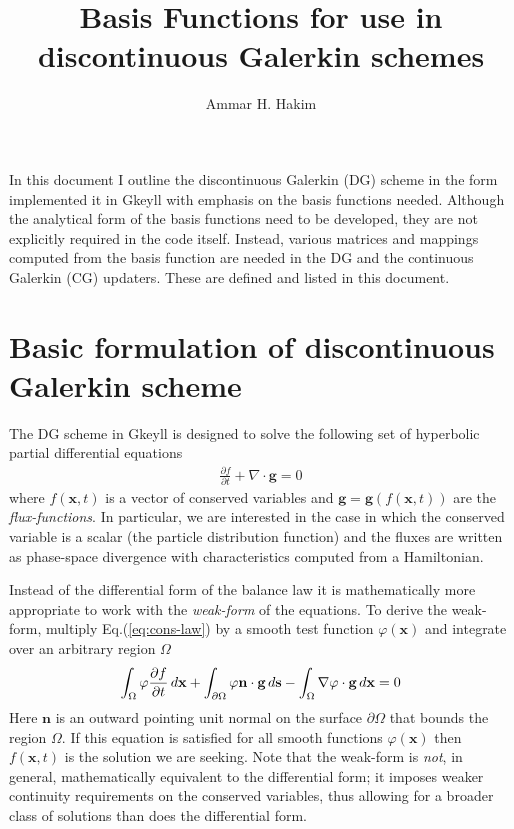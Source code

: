 \documentclass[11pt, reqno]{amsart}
\title[Basis Functions]{Basis Functions for use in discontinuous Galerkin schemes}
\author{Ammar H. Hakim}%
\date{}%
\newcommand{\eqr}[1]{Eq.\thinspace(#1)}
\newcommand{\pfrac}[2]{\frac{\partial #1}{\partial #2}}
\newcommand{\mvec}[1]{\mathbf{#1}}
\theoremstyle{definition}
\begin{document}
%
\maketitle

In this document I outline the discontinuous Galerkin (DG) scheme in
the form implemented it in Gkeyll with emphasis on the basis functions
needed. Although the analytical form of the basis functions need to be
developed, they are not explicitly required in the code
itself. Instead, various matrices and mappings computed from the basis
function are needed in the DG and the continuous Galerkin (CG)
updaters. These are defined and listed in this document.

\section{Basic formulation of discontinuous Galerkin scheme}

The DG scheme in Gkeyll is designed to solve the following set of
hyperbolic partial differential equations
\begin{align}
  \pfrac{f}{t} + \nabla\cdot\mvec{g} = 0 \label{eq:cons-law}
\end{align}
where $f(\mvec{x},t)$ is a vector of conserved variables and $\mvec{g}
= \mvec{g}(f(\mvec{x},t))$ are the \emph{flux-functions}. In
particular, we are interested in the case in which the conserved
variable is a scalar (the particle distribution function) and the
fluxes are written as phase-space divergence with characteristics
computed from a Hamiltonian.

Instead of the differential form of the balance law it is
mathematically more appropriate to work with the \emph{weak-form} of
the equations. To derive the weak-form, multiply
\eqr{\ref{eq:cons-law}} by a smooth test function $\varphi(\mvec{x})$
and integrate over an arbitrary region $\Omega$
\begin{align}
  \int_\Omega \varphi \pfrac{f}{t}\thinspace d\mvec{x} 
  + \int_{\partial \Omega}\varphi \mvec{n}\cdot\mvec{g}\thinspace d\mvec{s} 
  - \int_\Omega \nabla\varphi\cdot\mvec{g}\thinspace d\mvec{x}
  = 0
\end{align}
Here $\mvec{n}$ is an outward pointing unit normal on the surface
$\partial\Omega$ that bounds the region $\Omega$. If this equation is
satisfied for all smooth functions $\varphi(\mvec{x})$ then
$f(\mvec{x},t)$ is the solution we are seeking. Note that the
weak-form is \emph{not}, in general, mathematically equivalent to the
differential form; it imposes weaker continuity requirements on the
conserved variables, thus allowing for a broader class of solutions
than does the differential form.
\end{document}
